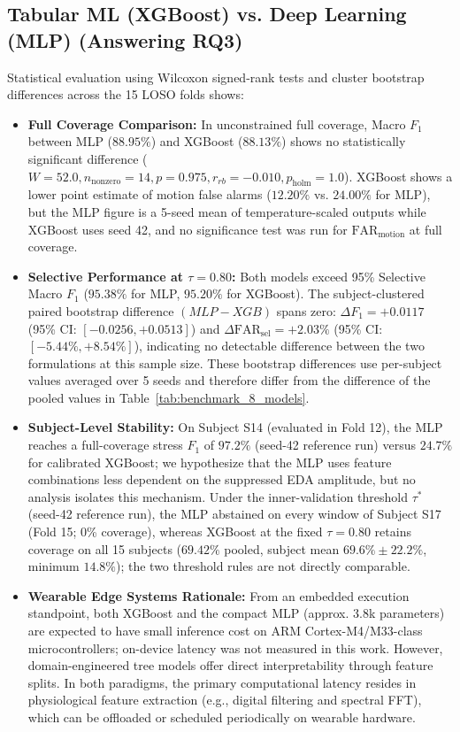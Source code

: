 \documentclass[conference]{IEEEtran}
\begin{document}
\begin{enumerate}
\end{enumerate}

\subsection{Tabular ML (XGBoost) vs. Deep Learning (MLP) (Answering RQ3)}
Statistical evaluation using Wilcoxon signed-rank tests and cluster bootstrap differences across the 15 LOSO folds shows:
\begin{itemize}
    \item \textbf{Full Coverage Comparison:} In unconstrained full coverage, Macro $F_1$ between MLP ($88.95\%$) and XGBoost ($88.13\%$) shows no statistically significant difference ($W = 52.0, n_{\text{nonzero}} = 14, p = 0.975, r_{rb} = -0.010, p_{\text{holm}} = 1.0$). XGBoost shows a lower point estimate of motion false alarms ($12.20\%$ vs. $24.00\%$ for MLP), but the MLP figure is a 5-seed mean of temperature-scaled outputs while XGBoost uses seed 42, and no significance test was run for $\text{FAR}_{\text{motion}}$ at full coverage.
    \item \textbf{Selective Performance at $\tau = 0.80$:} Both models exceed 95\% Selective Macro $F_1$ ($95.38\%$ for MLP, $95.20\%$ for XGBoost). The subject-clustered paired bootstrap difference $(MLP - XGB)$ spans zero: $\Delta F_1 = +0.0117$ (95\% CI: $[-0.0256, +0.0513]$) and $\Delta \text{FAR}_{\text{sel}} = +2.03\%$ (95\% CI: $[-5.44\%, +8.54\%]$), indicating no detectable difference between the two formulations at this sample size. These bootstrap differences use per-subject values averaged over 5 seeds and therefore differ from the difference of the pooled values in Table~\ref{tab:benchmark_8_models}.
    \item \textbf{Subject-Level Stability:} On Subject S14 (evaluated in Fold 12), the MLP reaches a full-coverage stress $F_1$ of $97.2\%$ (seed-42 reference run) versus $24.7\%$ for calibrated XGBoost; we hypothesize that the MLP uses feature combinations less dependent on the suppressed EDA amplitude, but no analysis isolates this mechanism. Under the inner-validation threshold $\tau^{*}$ (seed-42 reference run), the MLP abstained on every window of Subject S17 (Fold 15; 0\% coverage), whereas XGBoost at the fixed $\tau=0.80$ retains coverage on all 15 subjects ($69.42\%$ pooled, subject mean $69.6\% \pm 22.2\%$, minimum $14.8\%$); the two threshold rules are not directly comparable.
    \item \textbf{Wearable Edge Systems Rationale:} From an embedded execution standpoint, both XGBoost and the compact MLP (approx. 3.8k parameters) are expected to have small inference cost on ARM Cortex-M4/M33-class microcontrollers; on-device latency was not measured in this work. However, domain-engineered tree models offer direct interpretability through feature splits. In both paradigms, the primary computational latency resides in physiological feature extraction (e.g., digital filtering and spectral FFT), which can be offloaded or scheduled periodically on wearable hardware.
\end{itemize}
\end{document}
